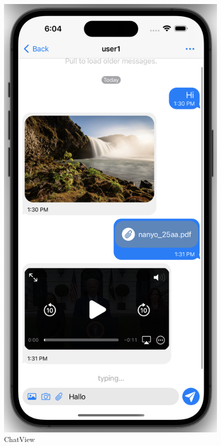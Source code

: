     \begin{figure}[h]
        \includegraphics[scale=0.5]{chat}
        \centering
        \caption{ChatView}\label{fig:chatview}
    \end{figure}

